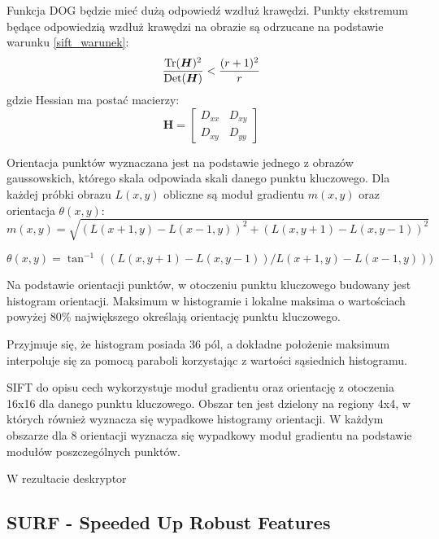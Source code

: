 Funkcja DOG będzie mieć dużą odpowiedź wzdłuż krawędzi. Punkty ekstremum będące odpowiedzią wzdłuż krawędzi na obrazie są odrzucane na podstawie warunku \ref{sift_warunek}:
\begin{equation} 
\label{sift_warunek} 
\frac{\operatorname{Tr}(\boldsymbol{H})^2}{\operatorname{Det}(\boldsymbol{H})} < \frac{(r+1)^2}{r}
\end{equation} gdzie Hessian ma postać macierzy:
\begin{equation} 
\label{sift_hessian} 
\boldsymbol{H} = 
	\begin{bmatrix}
		D_{xx} & D_{xy} \\
		D_{xy} & D_{yy}
	\end{bmatrix}
\end{equation}

Orientacja punktów wyznaczana jest na podstawie jednego z obrazów gaussowskich, którego skala odpowiada skali danego punktu kluczowego. Dla każdej próbki obrazu $L(x, y)$ obliczne są moduł gradientu $m(x, y)$ oraz orientacja $\theta(x, y)$:
\begin{equation} 
\label{sift_gradient_magnitude} 
m(x, y) = \sqrt{(L(x + 1, y) - L(x - 1, y))^2 + (L(x, y + 1) - L(x, y - 1))^2}
\end{equation}

\begin{equation} 
\label{sift_orientation} 
\theta(x, y) = \tan^{-1}((L(x, y + 1) - L(x, y - 1))/L(x + 1, y) - L(x - 1, y)))
\end{equation}

Na podstawie orientacji punktów, w otoczeniu punktu kluczowego budowany jest histogram orientacji. Maksimum w histogramie i lokalne maksima o wartościach powyżej 80\% największego określają orientację punktu kluczowego.

Przyjmuje się, że histogram posiada 36 pól, a dokładne położenie maksimum interpoluje się za pomocą paraboli korzystając z wartości sąsiednich histogramu.

SIFT do opisu cech wykorzystuje moduł gradientu oraz orientację z otoczenia 16x16 dla danego punktu kluczowego. Obszar ten jest dzielony na regiony 4x4, w których również wyznacza się wypadkowe histogramy orientacji. W każdym obszarze dla 8 orientacji wyznacza się wypadkowy moduł gradientu na podstawie modułów poszczególnych punktów.

W rezultacie deskryptor 

\subsection{SURF - Speeded Up Robust Features}


